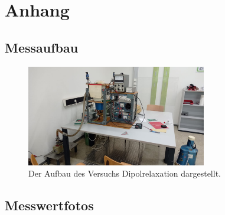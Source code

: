 \newpage
\section{Anhang}


\subsection{Messaufbau}



\begin{figure}[h]
    \centering
    \includegraphics[width=0.7\textwidth]{latex/images/Aufbau.jpeg}
    \caption{Der Aufbau des Versuchs Dipolrelaxation dargestellt.}
\end{figure}
%


\subsection{Messwertfotos}

